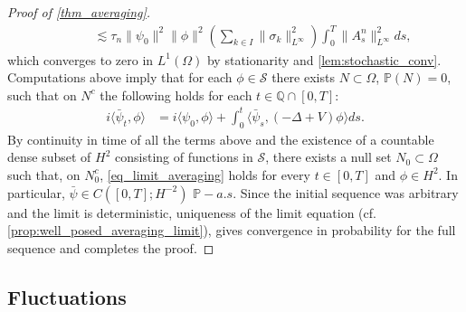 \documentclass[a4paper,10pt]{amsart}
\theoremstyle{remark}
\numberwithin{equation}{section}
\begin{document}
\begin{proof}[Proof of \cref{thm_averaging}]
\begin{align*}
 &\qquad\lesssim
 \tau_n\|\psi_0\|^2\|\phi\|^2
 \left(\sum_{k\in I}\|\sigma_k\|_{L^\infty}^2\right)
 \int_0^T\|A_s^n\|_{L^\infty}^2ds,
\end{align*}
which converges to zero in $L^1(\Omega)$ by stationarity and \cref{lem:stochastic_conv}. Computations above
imply that for each $\phi \in \mathscr{S}$ there exists
$N\subset \Omega$, $\mathbb{P}(N)=0$, such that on $N^c$ the following holds
for each $t\in \mathbb Q\cap [0,T]$:
\begin{align}\label{eq_limit_averaging}
    i\langle \bar{\psi}_t, \phi\rangle
    &=i\langle\psi_0,\phi\rangle
      +\int_0^t \langle \bar{\psi}_s, (-\Delta+V)\phi\rangle ds.
\end{align}
By continuity in time of all the terms above and the existence of a
countable dense subset of $H^2$ consisting of functions in $\mathscr{S}$,
there exists a null set $N_0\subset\Omega$ such that, on $N_0^c$,
\eqref{eq_limit_averaging} holds for every $t\in[0,T]$ and $\phi\in H^2$.
In particular,  $\bar{\psi} \in C([0,T];H^{-2})$ $\mathbb{P}-a.s.$ Since
the initial sequence was arbitrary and the limit is deterministic,
uniqueness of the limit equation (cf.
\cref{prop:well_posed_averaging_limit}), gives convergence in probability for the full sequence
and completes the proof.
\end{proof}
 
 
\subsection{Fluctuations}\label{sec:fluct_original}
\end{document}
